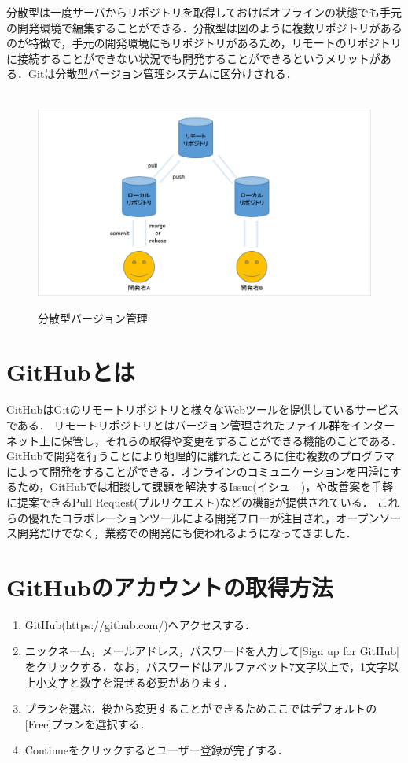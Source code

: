 \newpage
分散型は一度サーバからリポジトリを取得しておけばオフラインの状態でも手元の開発環境で編集することができる．分散型は図のように複数リポジトリがあるのが特徴で，手元の開発環境にもリポジトリがあるため，リモートのリポジトリに接続することができない状況でも開発することができるというメリットがある．Gitは分散型バージョン管理システムに区分けされる．

\begin{figure}[htb]
\centering　
\includegraphics[width=13cm]{bunnsann.PNG}
\caption{分散型バージョン管理}
\end{figure}

\newpage

\section{GitHubとは}
GitHubはGitのリモートリポジトリと様々なWebツールを提供しているサービスである．
リモートリポジトリとはバージョン管理されたファイル群をインターネット上に保管し，それらの取得や変更をすることができる機能のことである．
GitHubで開発を行うことにより地理的に離れたところに住む複数のプログラマによって開発をすることができる．オンラインのコミュニケーションを円滑にするため，GitHubでは相談して課題を解決するIssue(イシュ―)，や改善案を手軽に提案できるPull Request(プルリクエスト)などの機能が提供されている．
これらの優れたコラボレーションツールによる開発フローが注目され，オープンソース開発だけでなく，業務での開発にも使われるようになってきました．

\newpage

\section{GitHubのアカウントの取得方法}
\begin{enumerate}
 \item GitHub(https://github.com/)へアクセスする．
 \item ニックネーム，メールアドレス，パスワードを入力して[Sign up for GitHub]をクリックする．なお，パスワードはアルファベット7文字以上で，1文字以上小文字と数字を混ぜる必要があります．
 \item プランを選ぶ．後から変更することができるためここではデフォルトの[Free]プランを選択する．
 \item Continueをクリックするとユーザー登録が完了する．
\end{enumerate}
 
